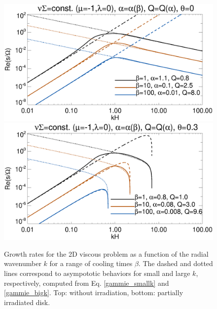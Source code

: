 \begin{figure}
  \includegraphics[width=\linewidth,clip=true,trim=0cm 1.5cm 0.4cm
    0.0cm]{figures/viscsg_modes}\\
  \includegraphics[width=\linewidth,clip=true,trim=0cm 0cm 0.4cm
    0.0cm]{figures/viscsg_modes_theta0d3}
  \caption{Growth rates for the 2D viscous problem as a function of
    the radial wavenumber $k$ for a range of cooling times
    $\beta$. The dashed and dotted lines correspond to asympototic
    behaviors for small and large $k$, respectively, computed from
    Eq. \ref{gammie_smallk} and \ref{gammie_bigk}. Top: without
    irradiation, bottom: partially irradiated disk. 
    \label{gammie_rate_plot}}
\end{figure}


